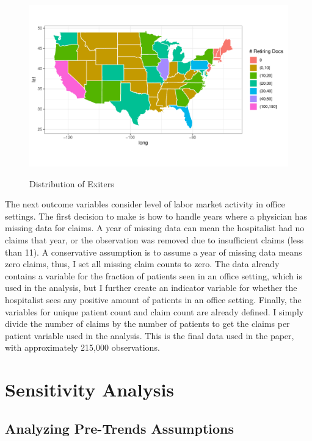 \documentclass[12pt]{article}
\begin{document}
\begin{figure}[ht!]
    \centering
    \caption{Distribution of Exiters}
    \includegraphics[width=\textwidth]{Objects/retire_dist_map.pdf}
    \label{fig:retire_dist}
\end{figure}

The next outcome variables consider level of labor market activity in office settings. The first decision to make is how to handle years where a physician has missing data for claims. A year of missing data can mean the hospitalist had no claims that year, or the observation was removed due to insufficient claims (less than 11). A conservative assumption is to assume a year of missing data means zero claims, thus, I set all missing claim counts to zero. The data already contains a variable for the fraction of patients seen in an office setting, which is used in the analysis, but I further create an indicator variable for whether the hospitalist sees any positive amount of patients in an office setting. Finally, the variables for unique patient count and claim count are already defined. I simply divide the number of claims by the number of patients to get the claims per patient variable used in the analysis. This is the final data used in the paper, with approximately 215,000 observations. 



\section{Sensitivity Analysis}

\subsection{Analyzing Pre-Trends Assumptions}\label{sec:pretrends}
\end{document}
